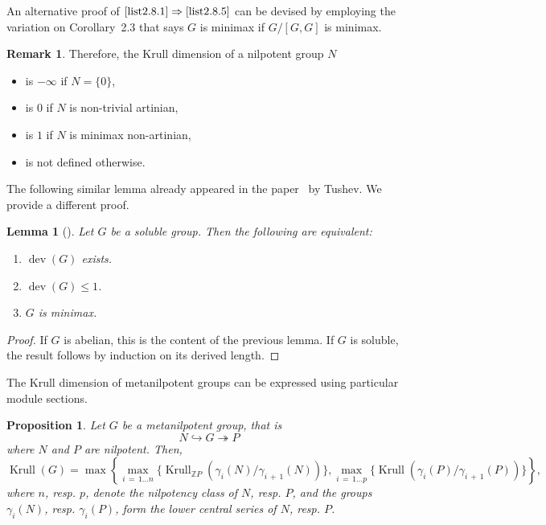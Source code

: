 \documentclass[11pt]{article}
\newtheorem{lemm}[theo]{Lemma}
\newtheorem{prop}[theo]{Proposition}
\theoremstyle{definition}
\newtheorem{rema}[theo]{Remark}
\numberwithin{equation}{section}
\numberwithin{figure}{section}
\numberwithin{table}{section}
\newcommand{\Z}{\mathbb{Z}}
\DeclareMathOperator{\dev}{dev}
\DeclareMathOperator{\krull}{Krull}
\newcommand*{\romanenumi}{\renewcommand*{\theenumi}{\roman{enumi}}}
\begin{document}
An alternative proof of $\eqref{list2.8.1}\Rightarrow\eqref{list2.8.5}$ can be devised by employing the variation on Corollary~2.3 that says $G$ is minimax if $G/[G,G]$ is minimax.



\begin{rema}
Therefore, the Krull dimension of a nilpotent group $N$
\begin{itemize}\romanenumi
\item \label{list2.9.1}is $-\infty$ if $N = \{0\}$,
\item \label{list2.9.2}is $0$ if $N$ is non-trivial artinian,
\item \label{list2.9.3}is $1$ if $N$ is minimax non-artinian,
\item \label{list2.9.4}is not defined otherwise.
\end{itemize}
\end{rema}

The following similar lemma already appeared in the paper~\cite{Tus} by Tushev. We provide a different proof.
\goodbreak
\begin{lemm}[\cite{Tus}]\label{lem-deviation soluble}
Let $G$ be a soluble group. Then the following are equivalent:
\begin{enumerate}
\item \label{list2.10.1}$\dev(G)$ exists.
\item \label{list2.10.2}$\dev(G)\le 1$.
\item \label{list2.10.3}$G$ is minimax.
\end{enumerate}
\end{lemm}


\begin{proof}
If $G$ is abelian, this is the content of the previous lemma. If $G$ is soluble, the result follows by induction on its derived length.
\end{proof}


The Krull dimension of metanilpotent groups can be expressed using particular module sections.

\begin{prop}
Let $G$ be a metanilpotent group, that is
\begin{equation*}
N \hookrightarrow G \twoheadrightarrow P
\end{equation*}
where $N$ and $P$ are nilpotent. Then,
\begin{equation*}
\krull(G) = \max\!\left\{\!\max\limits_{i\,=\,1\dots n} \big\{\!\krull_{\Z P}(\gamma_i(N)/\gamma_{i\,+\,1}(N))\big\}, \max\limits_{i\,=\,1\dots p} \big\{\!\krull(\gamma_i(P)/\gamma_{i\,+\,1}(P))\big\}\!\right\}\!,
\end{equation*}
where $n$, resp. $p$, denote the nilpotency class of $N$, resp. $P$, and the groups $\gamma_i(N)$, resp. $\gamma_i(P)$, form the lower central series of $N$, resp. $P$.
\end{prop}
\end{document}
